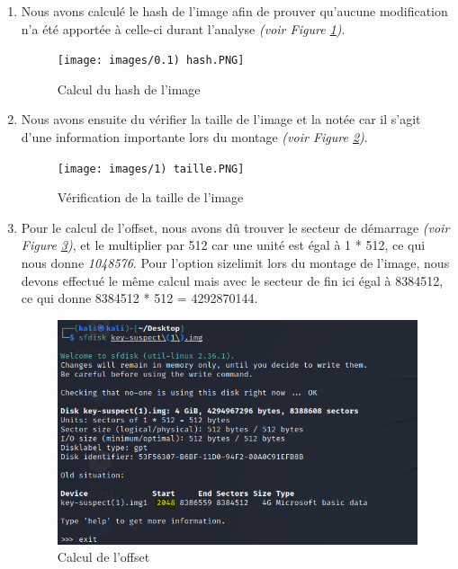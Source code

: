 \documentclass[a4paper]{article}
\begin{document}
\begin{enumerate}
    \item Nous avons calculé le hash de l'image afin de prouver qu'aucune modification n'a été apportée à celle-ci durant l'analyse \emph{(voir Figure \ref{hash_begining})}.
    \begin{figure}[H]
        \centering
        \texttt{[image: images/0.1) hash.PNG]}
        \caption{Calcul du hash de l'image}
        \label{hash_begining}
    \end{figure}
    
    \item Nous avons ensuite du vérifier la taille de l'image et la notée car il s'agit d'une information importante lors du montage \emph{(voir Figure \ref{check_width})}.
    \begin{figure}[H]
        \centering
        \texttt{[image: images/1) taille.PNG]}
        \caption{Vérification de la taille de l'image}
        \label{check_width}
    \end{figure}
    
    \item Pour le calcul de l'offset, nous avons dû trouver le secteur de démarrage \emph{(voir Figure \ref{start_sector})}, et le multiplier par 512 car une unité est égal à 1 * 512, ce qui nous donne \emph{1048576}. Pour l'option sizelimit lors du montage de l'image, nous devons effectué le même calcul mais avec le secteur de fin ici égal à 8384512, ce qui donne 8384512 * 512 = 4292870144.
    \begin{figure}[H]
        \centering
        \includegraphics[width=11cm]{images/2) calcul_offset.PNG}
        \caption{Calcul de l'offset}
        \label{start_sector}
    \end{figure}
    

\end{enumerate}
\end{document}
